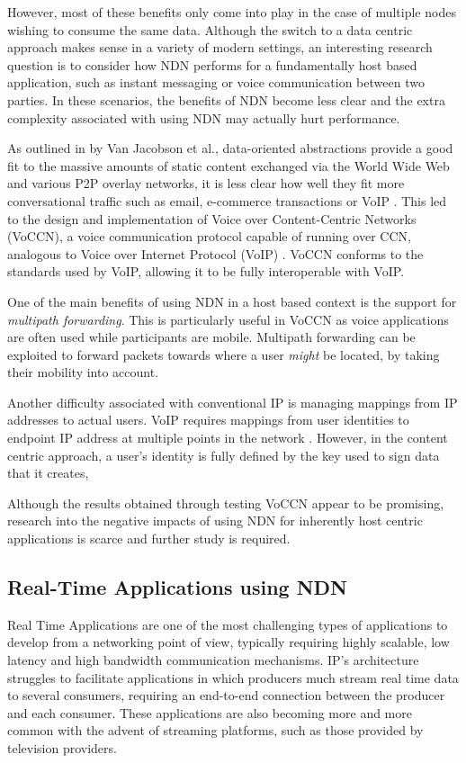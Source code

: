 However, most of these benefits only come into play in the case of multiple nodes wishing to consume the same data. Although the switch to a data centric approach makes sense in a variety of modern settings, an interesting research question is to consider how NDN performs for a fundamentally host based application, such as instant messaging or voice communication between two parties. In these scenarios, the benefits of NDN become less clear and the extra complexity associated with using NDN may actually hurt performance.

As outlined in by Van Jacobson et al., data-oriented abstractions provide a good fit to the massive amounts of static content exchanged via the World Wide Web and various P2P overlay networks, it is less clear how well they fit more conversational traffic such as email, e-commerce transactions or VoIP \cite{vj-voccn}. This led to the design and implementation of Voice over Content-Centric Networks (VoCCN), a voice communication protocol capable of running over CCN, analogous to Voice over Internet Protocol (VoIP) \cite{voip}. VoCCN conforms to the standards used by VoIP, allowing it to be fully interoperable with VoIP. 

One of the main benefits of using NDN in a host based context is the support for \textit{multipath forwarding}. This is particularly useful in VoCCN as voice applications are often used while participants are mobile. Multipath forwarding can be exploited to forward packets towards where a user \textit{might} be located, by taking their mobility into account.

Another difficulty associated with conventional IP is managing mappings from IP addresses to actual users. VoIP requires mappings from user identities to endpoint IP address at multiple points in the network \cite{vj-voccn}. However, in the content centric approach, a user's identity is fully defined by the key used to sign data that it creates,  

Although the results obtained through testing VoCCN appear to be promising, research into the negative impacts of using NDN for inherently host centric applications is scarce and further study is required.


\subsection{Real-Time Applications using NDN}
Real Time Applications are one of the most challenging types of applications to develop from a networking point of view, typically requiring highly scalable, low latency and high bandwidth communication mechanisms. IP's architecture struggles to facilitate applications in which producers much stream real time data to several consumers, requiring an end-to-end connection between the producer and each consumer. These applications are also becoming more and more common with the advent of streaming platforms, such as those provided by television providers.

